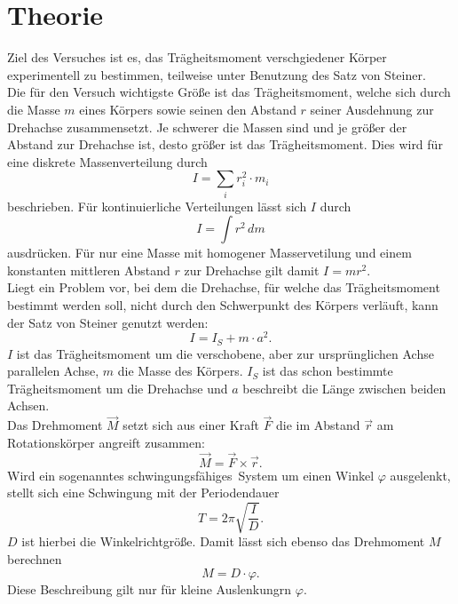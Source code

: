 \section{Theorie}
\label{sec:Theorie}
Ziel des Versuches ist es, das Trägheitsmoment verschgiedener Körper
experimentell zu bestimmen, teilweise unter Benutzung des Satz von Steiner.
\\ \noindent
Die für den Versuch wichtigste Größe ist das Trägheitsmoment, welche sich durch die Masse $m$
eines Körpers sowie seinen den Abstand $r$ seiner Ausdehnung zur Drehachse zusammensetzt. Je schwerer die Massen sind und je größer der Abstand 
zur Drehachse ist, desto größer ist das Trägheitsmoment. Dies wird für eine diskrete Massenverteilung durch  
\begin{equation}
    I=\sum_i r_i^2\cdot m_i
\end{equation}
beschrieben.
Für kontinuierliche Verteilungen lässt sich $I$ durch 
\begin{equation}
    I=\int r^2\, dm
\end{equation}
ausdrücken. Für nur eine Masse mit homogener Masservetilung und einem konstanten mittleren Abstand $r$ zur Drehachse gilt damit 
$I=mr^2$. \\ \noindent
Liegt ein Problem vor, bei dem die Drehachse, für welche das Trägheitsmoment bestimmt werden soll,
nicht durch den Schwerpunkt des Körpers verläuft, kann der Satz von Steiner genutzt werden: 
\begin{equation}
    I=I_S+m\cdot a^2.
\end{equation}
$I$ ist das Trägheitsmoment um die verschobene, aber zur ursprünglichen Achse parallelen Achse,
$m$ die Masse des Körpers. $I_S$ ist das schon bestimmte Trägheitsmoment um die Drehachse und $a$
beschreibt die Länge zwischen beiden Achsen.\\ \noindent
Das Drehmoment $\vec M$ setzt sich aus einer Kraft $\vec F$ die im Abstand $\vec r$ am Rotationskörper 
angreift zusammen:
\begin{equation}
    \vec M=\vec F\times\vec r.
\end{equation}
Wird ein sogenanntes \glqq schwingungsfähiges\grqq\, System um einen Winkel $\varphi$ ausgelenkt,
stellt sich eine Schwingung mit der  Periodendauer 
\begin{equation}
    T=2\pi\sqrt{\frac{I}{D}}.
\end{equation}
$D$ ist hierbei die Winkelrichtgröße. Damit lässt sich ebenso das Drehmoment $M$ berechnen 
\begin{equation}
    M=D\cdot \varphi.
\end{equation}
Diese Beschreibung gilt nur für kleine Auslenkungrn $\varphi$.
